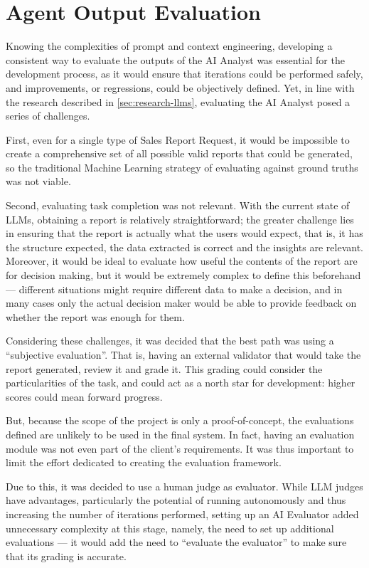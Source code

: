 \documentclass[a4paper]{report}
\begin{document}
\section{Agent Output Evaluation}
\label{sec:agent-evals}

Knowing the complexities of prompt and context engineering, developing a consistent way to evaluate the outputs of the AI Analyst was essential for the development process, as it would ensure that iterations could be performed safely, and improvements, or regressions, could be objectively defined. Yet, in line with the research described in \autoref{sec:research-llms}, evaluating the AI Analyst posed a series of challenges.

First, even for a single type of Sales Report Request, it would be impossible to create a comprehensive set of all possible valid reports that could be generated, so the traditional Machine Learning strategy of evaluating against ground truths was not viable.

Second, evaluating task completion was not relevant. With the current state of LLMs, obtaining a report is relatively straightforward; the greater challenge lies in ensuring that the report is actually what the users would expect, that is, it has the structure expected, the data extracted is correct and the insights are relevant. Moreover, it would be ideal to evaluate how useful the contents of the report are for decision making, but it would be extremely complex to define this beforehand --- different situations might require different data to make a decision, and in many cases only the actual decision maker would be able to provide feedback on whether the report was enough for them.

Considering these challenges, it was decided that the best path was using a ``subjective evaluation''. That is, having an external validator that would take the report generated, review it and grade it. This grading could consider the particularities of the task, and could act as a north star for development: higher scores could mean forward progress.

But, because the scope of the project is only a proof-of-concept, the evaluations defined are unlikely to be used in the final system. In fact, having an evaluation module was not even part of the client's requirements. It was thus important to limit the effort dedicated to creating the evaluation framework.

Due to this, it was decided to use a human judge as evaluator. While LLM judges have advantages, particularly the potential of running autonomously and thus increasing the number of iterations performed, setting up an AI Evaluator added unnecessary complexity at this stage, namely, the need to set up additional evaluations --- it would add the need to ``evaluate the evaluator'' to make sure that its grading is accurate.
\end{document}
